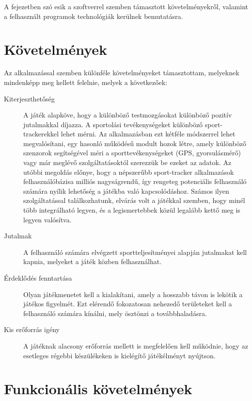 
A fejezetben szó esik a szoftverrel szemben támasztott követelményekről, valamint a felhasznált programok technológiák kerülnek bemutatásra. 

\section{Követelmények}
\label{kovetelmenyek}

Az alkalmazással szemben különféle követelményeket támasztottam, melyeknek mindenképp meg kellett felelnie, melyek a következőek: 

\begin{description}
	\item [Kiterjeszthetőség] 
    A játék alapköve, hogy a különböző testmozgásokat különböző pozitív jutalmakkal díjazza. 
	A sportolási tevékenységeket különböző sport-trackerekkel lehet mérni. 
	Az alkalmazásban ezt kétféle módszerrel lehet megvalósítani, egy hasonló működésű modult hozok létre, amely különböző szenzorok segítségével méri a sporttevékenységeket (GPS, gyorsulásmérő) vagy már meglévő szolgáltatásoktól szerezzük be ezeket az adatok. 
	Az utóbbi megoldás előnye, hogy a népszerűbb sport-tracker alkalmazások felhasználóbázisa milliós nagyságrendű, így rengeteg potenciális felhasználó számára nyílik lehetőség a játékba való kapcsolódáshoz. 
	Számos ilyen szolgáltatással találkozhatunk, elvárás volt a játékkal szemben, hogy minél több integrálható legyen, és a legismertebbek közül legalább kettő meg is legyen valósítva.	
	\item [Jutalmak] 
	A felhasználó számára elvégzett sportteljesítményei alapján jutalmakat kell kapnia, melyeket a játék közben felhasználhat. 
	\item [Érdeklődés fenntartása] 
	Olyan játékmenetet kell a kialakítani, amely a hosszabb távon is lekötik a játékos figyelmét. 
	Ezt elérendő fokozatosan nehezedő területeket kell a felhasználó számára kínálni, mely ösztönzi a továbbhaladásra.
	\item [Kis erőforrás igény] 
	A játéknak alacsony erőforrás mellett is megfelelően kell működnie, hogy az esetleges régebbi készülékeken is kielégítő játékélményt nyújtson. 
\end{description}


\section*{Funkcionális követelmények}
\label{funkckovetelmenyeks}

